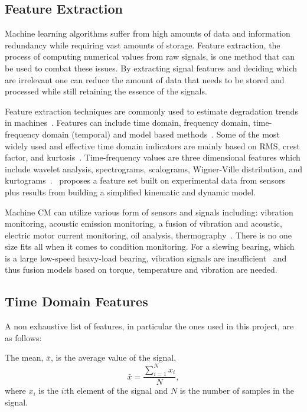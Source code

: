 \documentclass[]{article}
\begin{document}
\subsection{Feature Extraction}
Machine learning algorithms suffer from high amounts of data and information redundancy while requiring vast amounts of storage. Feature extraction, the process of computing numerical values from raw signals, is one method that can be used to combat these issues. By extracting signal features and deciding which are irrelevant one can reduce the amount of data that needs to be stored and processed while still retaining the essence of the signals.

Feature extraction techniques are commonly used to estimate degradation trends in machines~\cite{caesarendra2017review,adams2017comparison,hong2014condition}.
Features can include time domain, frequency domain, time-frequency domain (temporal) and model based methods~\cite{teti2010advanced}. Some of the most widely used and effective time domain indicators are mainly based on \gls{RMS}, crest factor, and kurtosis~\cite{soualhi2021novel}. Time-frequency values are three dimensional features which include wavelet analysis, spectrograms, scalograms, Wigner-Ville distribution, and kurtograms~\cite{soualhi2021novel}.~\cite{d2019physical} proposes a feature set built on experimental data from sensors plus results from building a simplified kinematic and dynamic model.

Machine \gls{CM} can utilize various form of sensors and signals including: vibration monitoring, acoustic emission monitoring, a fusion of vibration and acoustic, electric motor current monitoring, oil analysis, thermography~\cite{ahmed2020condition}. There is no one size fits all when it comes to condition monitoring. For a slewing bearing, which is a large low-speed heavy-load bearing, vibration signals are insufficient~\cite{wang2016multiple} and thus fusion models based on torque, temperature and vibration are needed.

\subsection{Time Domain Features} 	
A non exhaustive list of features, in particular the ones used in this project, are as follows:

The mean, $ \bar{x} $, is the average value of the signal,
\begin{equation}
\bar{x} = \frac{\sum^N_{i=1} x_i}{N},
\end{equation}
where $ x_i $ is the $ i $:th element of the signal and $ N $ is the number of samples in the signal.
\end{document}
